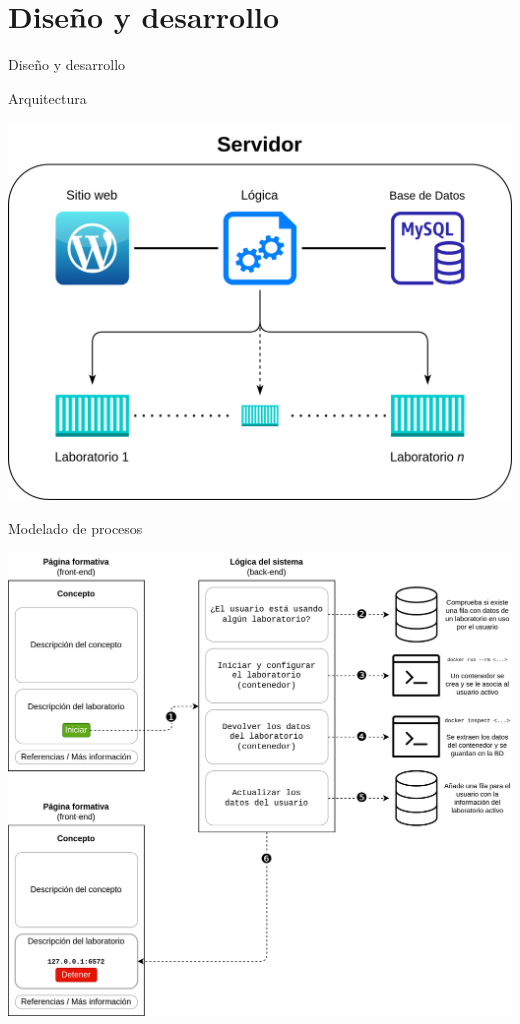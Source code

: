 \section{Diseño y desarrollo}

    \begin{frame}
        \Huge{\centerline{Diseño y desarrollo}}
    \end{frame}

    \begin{frame}{Arquitectura}
        \centering

        \includegraphics[scale=0.15]{images/diagramas/arquitectura.png}
    \end{frame}

    \begin{frame}{Modelado de procesos}
        \centering

        \includegraphics[scale=0.09]{images/diagramas/iniciar.png}
    \end{frame}

